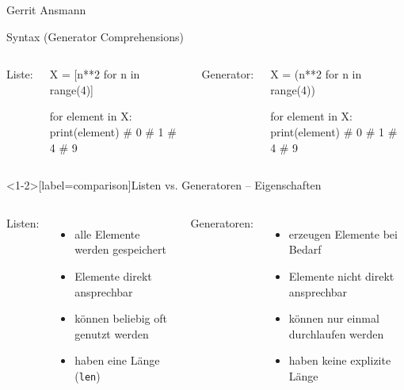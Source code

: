 \documentclass[xcolor=dvipsnames, aspectratio=169, 14pt]{beamer}
\begin{document}
\begin{frame}[plain]
\begin{center}

\vfill


\vfill

Gerrit Ansmann

\vfill
\end{center}
\end{frame}

\begin{frame}[fragile]{Syntax (Generator Comprehensions)}
	\begin{columns}%
		Liste:
	\begin{python3code}
	X = [n**2 for n in range(4)]
	
	for element in X:
		print(element)
	# 0
	# 1
	# 4
	# 9
	\end{python3code}
		Generator:
	\begin{python3code}
	X = (n**2 for n in range(4))
	
	for element in X:
		print(element)
	# 0
	# 1
	# 4
	# 9
	\end{python3code}
	\end{columns}
\end{frame}

\begin{frame}<1-2>[label=comparison]{Listen vs. Generatoren – Eigenschaften}
	\begin{columns}%
	\column{0.5\linewidth}
		Listen:
		\vspace{0.5\baselineskip}
		\begin{itemize}[topsep=0.5\baselineskip]
			\setlength{\itemsep}{0.5\baselineskip}
			\item<alert@2> alle Elemente werden gespeichert
			\item<alert@3> Elemente direkt ansprechbar
			\item<alert@4> können beliebig oft\\ genutzt werden
			\item<alert@5> haben eine Länge (\texttt{len})
		\end{itemize}
	\column{0.5\linewidth}
		Generatoren:
		\begin{itemize}
		\vspace{0.5\baselineskip}
			\setlength{\itemsep}{0.5\baselineskip}
			\item<alert@2> erzeugen Elemente bei Bedarf
			\item<alert@3> Elemente nicht direkt ansprechbar
			\item<alert@4> können nur einmal durchlaufen werden
			\item<alert@5> haben keine explizite Länge
		\end{itemize}
	\end{columns}
\end{frame}
\end{document}
